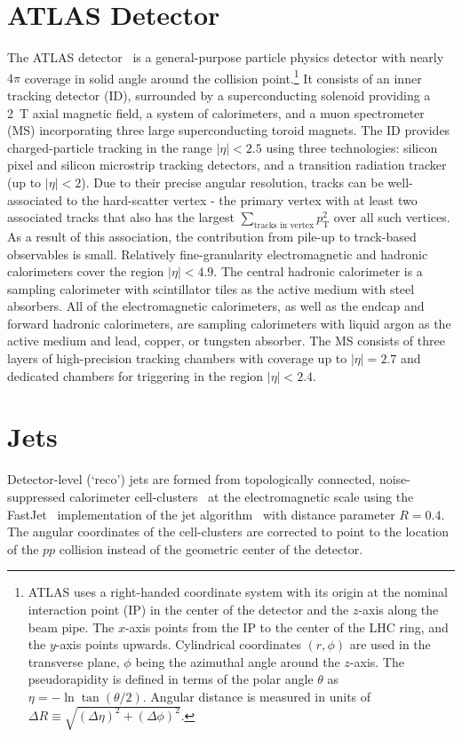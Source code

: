 \newcommand{\AtlasCoordFootnote}{
ATLAS uses a right-handed coordinate system with its origin at the nominal interaction point (IP)
in the center of the detector and the $z$-axis along the beam pipe.
The $x$-axis points from the IP to the center of the LHC ring,
and the $y$-axis points upwards.
Cylindrical coordinates $(r,\phi)$ are used in the transverse plane, 
$\phi$ being the azimuthal angle around the $z$-axis.
The pseudorapidity is defined in terms of the polar angle $\theta$ as $\eta = -\ln \tan(\theta/2)$.
Angular distance is measured in units of $\Delta R \equiv \sqrt{(\Delta\eta)^{2} + (\Delta\phi)^{2}}$.}


\section{ATLAS Detector}
\label{sec:ATLAS:ATLAS}
The ATLAS detector~\cite{PERF-2007-01} is a general-purpose particle physics detector 
%
with nearly $4\pi$ coverage in solid angle around the collision point.\footnote{\AtlasCoordFootnote}
%
It consists of an inner tracking detector (ID),  surrounded by a superconducting solenoid providing a \SI{2}{\tesla} axial magnetic field, a system of calorimeters, and a muon spectrometer (MS) incorporating three large superconducting toroid magnets.  
The ID provides charged-particle tracking in the range $|\eta| < 2.5$ using three technologies: silicon pixel and silicon microstrip tracking detectors, and a transition radiation tracker (up to $|\eta| < 2$).  Due to their precise angular resolution, tracks can be well-associated to the hard-scatter vertex - the primary vertex with at least two associated tracks that also has the largest $\sum_\text{tracks in vertex} p_\text{T}^2$ over all such vertices.  As a result of this association, the contribution from pile-up to track-based observables is small.  
%
%
Relatively fine-granularity electromagnetic and hadronic calorimeters cover the region $|\eta| < 4.9$. 
The central hadronic calorimeter is a sampling calorimeter with scintillator tiles as the active medium with steel absorbers. All of the electromagnetic calorimeters, as well as the endcap and forward hadronic calorimeters, are sampling calorimeters with liquid argon as the active medium and lead, copper, or tungsten absorber.
%
%
The MS consists of three layers of high-precision tracking chambers with coverage up to $|\eta|=2.7$ and dedicated chambers for triggering in the region $|\eta|<2.4$. 


\section{Jets}
\label{sec:ATLAS:jets}
Detector-level (`reco') jets are formed from topologically connected, noise-suppressed calorimeter cell-clusters~\cite{Aad:2016upy} at the electromagnetic scale using the FastJet~\cite{Cacciari:2011ma} implementation of the \antikt jet algorithm~\cite{Cacciari:2008gp} with distance parameter $R = 0.4$.   The angular coordinates of the cell-clusters are corrected to point to the location of the $pp$ collision instead of the geometric center of the detector.  

